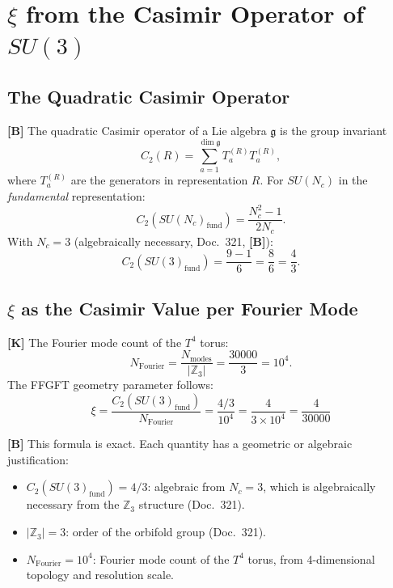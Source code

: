 \section{$\xi$ from the Casimir Operator of $SU(3)$}

\subsection{The Quadratic Casimir Operator}

\textbf{[B]} The quadratic Casimir operator of a Lie algebra $\mathfrak{g}$
is the group invariant
\begin{equation}
  C_2(R) = \sum_{a=1}^{\dim\mathfrak{g}} T_a^{(R)} T_a^{(R)},
  \label{eq:casimir_def}
\end{equation}
where $T_a^{(R)}$ are the generators in representation $R$.
For $SU(N_c)$ in the \emph{fundamental} representation:
\begin{equation}
  C_2(SU(N_c)_{\text{fund}}) = \frac{N_c^2 - 1}{2N_c}.
  \label{eq:casimir_SUN}
\end{equation}
With $N_c = 3$ (algebraically necessary, Doc.~321, \textbf{[B]}):
\begin{equation}
  C_2(SU(3)_{\text{fund}})
  = \frac{9 - 1}{6} = \frac{8}{6} = \frac{4}{3}.
  \label{eq:casimir_SU3}
\end{equation}

\subsection{$\xi$ as the Casimir Value per Fourier Mode}

\textbf{[K]} The Fourier mode count of the $T^4$ torus:
\begin{equation}
  N_{\text{Fourier}} = \frac{N_{\text{modes}}}{|\mathbb{Z}_3|}
  = \frac{30000}{3} = 10^4.
  \label{eq:NFourier}
\end{equation}
The FFGFT geometry parameter follows:
\begin{equation}
  \boxed{\xi = \frac{C_2(SU(3)_{\text{fund}})}{N_{\text{Fourier}}}
  = \frac{4/3}{10^4}
  = \frac{4}{3 \times 10^4}
  = \frac{4}{30000}}
  \label{eq:xi_casimir}
\end{equation}

\textbf{[B]} This formula is exact. Each quantity has a geometric or
algebraic justification:
\begin{itemize}
  \item $C_2(SU(3)_{\text{fund}}) = 4/3$: algebraic from $N_c = 3$,
    which is algebraically necessary from the $\mathbb{Z}_3$ structure
    (Doc.~321).
  \item $|\mathbb{Z}_3| = 3$: order of the orbifold group (Doc.~321).
  \item $N_{\text{Fourier}} = 10^4$: Fourier mode count of the $T^4$
    torus, from 4-dimensional topology and resolution scale.
\end{itemize}

